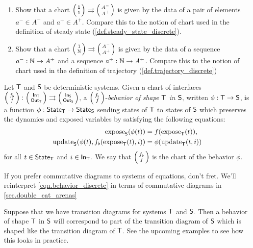 \documentclass[DynamicalBook]{subfiles}
\begin{document}
\begin{exercise}
  \begin{enumerate}
    \item Show that a chart $\lens{\ord{1}}{\ord{1}} \rightrightarrows
      \lens{A^-}{A^+}$ is given by the data of a pair of elements $a^{-} \in A^{-}$
      and $a^+ \in A^+$. Compare this to the notion of chart used in the
      definition of steady state (\cref{def.steady_state_discrete}).
     \item Show that a chart $\lens{\ord{1}}{\nn} \rightrightarrows
       \lens{A^-}{A^+}$ is given by the data of a sequence $a^- : \mathbb{N} \to A^+$
       and a sequence $a^+ : \mathbb{N} \to A^+$. Compare this to the notion of chart
       used in the definition of trajectory (\cref{def.trajectory_discrete})
  \end{enumerate}
\end{exercise}




\begin{definition} \label{def.behavior_discrete}
  Let $\mathsf{T}$ and $\mathsf{S}$ be deterministic systems. Given a chart of interfaces $\lens{f_{\flat}}{f}:
  \lens{\In{T}}{\Out{T}} \rightrightarrows \lens{\In{S}}{\Out{S}}$, a $\lens{f_{\flat}}{f}$-\emph{behavior of
  shape $\mathsf{T}$ in $\mathsf{S}$}, written
 $\phi :
\mathsf{T} \to \mathsf{S}$, is a function $\phi : \mathsf{State}_{\mathsf{T}} \to \mathsf{State}_{\mathsf{S}}$ sending
states of $\mathsf{T}$ to states of $\mathsf{S}$ which preserves the dynamics and
exposed variables by satisfying the following equations:
\begin{equation}\label{eqn.behavior_discrete}
\begin{aligned}
  \mathrm{expose}_{\mathsf{S}}(\phi(t)) &= f(\mathrm{expose}_{\mathsf{T}}(t)), \\
  \mathrm{update}_{\mathsf{S}}(\phi(t), f_{\flat}(\mathrm{expose}_{\mathsf{T}}(t), i)) &= \phi(\mathrm{update}_{\mathsf{T}}(t, i))
\end{aligned}
\end{equation}
for all $t \in \mathsf{State}_{\mathsf{T}}$ and $i \in \mathsf{In}_{\mathsf{T}}$. We say that $\lens{f_{\flat}}{f}$
is the chart of the behavior $\phi$.
\end{definition}

\begin{remark}
  If you prefer commutative diagrams to systems of equations, don't fret. We'll
  reinterpret \cref{eqn.behavior_discrete} in terms of commutative diagrams in \cref{sec.double_cat_arenas}
\end{remark}

\begin{remark}
  Suppose that we have transition diagrams for systems $\mathsf{T}$ and $\mathsf{S}$.
  Then a behavior of shape $\mathsf{T}$ in $\mathsf{S}$ will correspond to part of the
  transition diagram of $\mathsf{S}$ which is shaped like the transition diagram of
  $\mathsf{T}$. See the upcoming examples to see how this looks in practice.
\end{remark}
\end{document}

